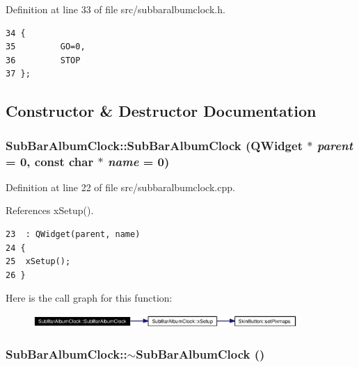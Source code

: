 Definition at line 33 of file src/subbaralbumclock.h.



\footnotesize\begin{verbatim}34 {
35         GO=0,
36         STOP
37 };
\end{verbatim}\normalsize 


\subsection{Constructor \& Destructor Documentation}
\subsubsection{\setlength{\rightskip}{0pt plus 5cm}Sub\-Bar\-Album\-Clock::Sub\-Bar\-Album\-Clock ({\bf QWidget} $\ast$ {\em parent} = 0, const char $\ast$ {\em name} = 0)}\label{classSubBarAlbumClock_SubBarAlbumClocka0}




Definition at line 22 of file src/subbaralbumclock.cpp.

References x\-Setup().



\footnotesize\begin{verbatim}23  : QWidget(parent, name)
24 {
25  xSetup();
26 }
\end{verbatim}\normalsize 


Here is the call graph for this function:\begin{figure}[H]
\begin{center}
\leavevmode
\includegraphics[width=284pt]{classSubBarAlbumClock_SubBarAlbumClocka0_cgraph}
\end{center}
\end{figure}
\subsubsection{\setlength{\rightskip}{0pt plus 5cm}Sub\-Bar\-Album\-Clock::$\sim${\bf Sub\-Bar\-Album\-Clock} ()}\label{classSubBarAlbumClock_SubBarAlbumClocka1}




